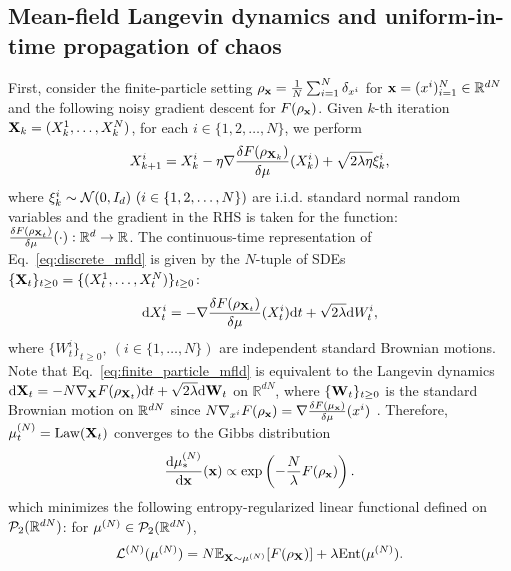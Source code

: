 \subsection{Mean-field Langevin dynamics and uniform-in-time propagation of chaos}
First, consider the finite-particle setting $\rho_{\mathbf{x}}=\frac{1}{N}\sum_{i=1}^N \delta_{x^i}$ for $\mathbf{x}=(x^i)_{i=1}^N \in \mathbb{R}^{dN}$ and the following noisy gradient descent for $F(\rho_{\mathbf{x}})$. Given $k$-th iteration $\mathbf{X}_k = (X_k^1,\ldots,X_k^N)$, for each $i \in \{1,2,\ldots,N\}$, we perform
\begin{equation}\label{eq:discrete_mfld}
    X_{k+1}^i = X_k^i - \eta \nabla \frac{\delta F(\rho_{\mathbf{X}_k})}{\delta \mu}(X_k^i) + \sqrt{2\lambda \eta} \xi_k^i,
\end{equation}
where $\xi_k^i \sim \mathcal{N}(0,I_d)~(i\in \{1,2,\ldots,N\})$ are i.i.d. standard normal random variables and the gradient in the RHS is taken for the function: $\frac{\delta F(\rho_{\mathbf{X}_t})}{\delta \mu}(\cdot): \mathbb{R}^d \rightarrow \mathbb{R}$.
The continuous-time representation of Eq.~\eqref{eq:discrete_mfld} is given by the $N$-tuple of SDEs $\{\mathbf{X}_t\}_{t\geq 0} = \{(X_t^1,\ldots,X_t^N)\}_{t\geq 0}$:
\begin{equation}\label{eq:finite_particle_mfld}
    \mathrm{d} X_t^i = - \nabla \frac{\delta F (\rho_{\mathbf{X}_t})}{\delta \mu}(X_t^i)\mathrm{d} t + \sqrt{2\lambda}\mathrm{d} W_t^i,
\end{equation}
where $\{W_t^i\}_{t\geq 0},~(i\in \{1,\ldots,N\})$ are independent standard Brownian motions. Note that Eq.~\eqref{eq:finite_particle_mfld} is equivalent to the Langevin dynamics $\mathrm{d} \mathbf{X}_t = - N \nabla_{\mathbf{X}} F(\rho_{\mathbf{X}_t}) \mathrm{d} t + \sqrt{2\lambda}\mathrm{d} \mathbf{W}_t$ on $\mathbb{R}^{dN}$, where $\{\mathbf{W}_t\}_{t\geq 0}$ is the standard Brownian motion on $\mathbb{R}^{dN}$ since $N \nabla_{x^i} F(\rho_{\mathbf{x}}) = \nabla \frac{\delta F (\mu_{\mathbf{x}})}{\delta \mu}(x^i)$ \citep{chizat2022mean}.
Therefore, $\pow[\mu,N]_t = \mathrm{Law}(\vX_t)$ converges to the Gibbs distribution
\begin{equation*}\label{eq:finite_particle_opt}
    \frac{\rd \pow[\mu,N]_*}{\rd \vx}(\vx) \propto \exp\left( - \frac{N}{\lambda}F(\rho_\vx)\right).
\end{equation*}
which minimizes the following entropy-regularized linear functional defined on $\mathcal{P}_2(\mathbb{R}^{dN})$: for $\pow[\mu,N]\in \cP_2(\bR^{dN})$,
\begin{equation}\label{prob:finite_particle_opt}
    \pow[\cL,N]( \pow[\mu,N]) 
    = N \bE_{\vX \sim \pow[\mu,N]}[ F(\rho_\vX)] + \lambda \Ent(\pow[\mu,N]).
\end{equation}

